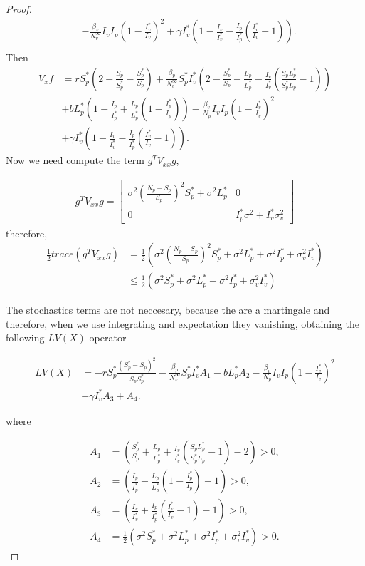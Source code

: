 \begin{proof}
\begin{align*}
				&-
					\frac{\beta_v}{N^\infty_v}I_vI_p\left(1-\frac{I_v^*}{I_v}\right)^2+\gamma I_v^*\left(1-\frac{I_v}{I_v^*}-\frac{I_p}{I_p^*}\left(\frac{I_v^*}{I_v}-1\right)\right).\\
	\end{align*}
Then
	\begin{align*}
		V_xf  	&=
					rS_p^*\left(2-\frac{S_p}{S_p^*}-\frac{S_p^*}{S_p}\right)+\frac{\beta_p}{N^\infty_v}S_p^*I_v^*\left(2-\frac{S_p^*}{S_p}-\frac{L_p}{L_p^*}-\frac{I_v}{I_v^*}\left(\frac{S_pL_p^*}{S_p^*L_p}-1\right)\right)\\
	  		  	&+
	  		  		bL_p^*\left(1-\frac{I_p}{I_p^*}+\frac{L_p}{L_p^*}\left(1-\frac{I_p^*}{I_p}\right)\right)-\frac{\beta_v}{N_p}I_vI_p\left(1-\frac{I_v^*}{I_v}\right)^2\\
	  		  	&+ 
	  		  		\gamma I_v^* \left(1-\frac{I_v}{I_v^*}-\frac{I_p}{I_p^*}\left(\frac{I_v^*}{I_v}-1\right)\right).		
	\end{align*}
	Now we need compute the term $g^TV_{xx}g$, 
	
	
	\begin{align*}
		g^TV_{xx}g=\begin{bmatrix}
		\sigma^2 \left(\frac{N_p-S_p}{S_p}\right)^2 S^*_p+\sigma^2 L^*_p &0\\
		0 & I^*_p \sigma^2+I^*_v \sigma_v^2
		\end{bmatrix}
	\end{align*}
	therefore,
		\begin{align*}
	\frac{1}{2}trace(g^TV_{xx}g) &=
		\frac{1}{2}\left(\sigma^2\left(\frac{N_p-S_p}{S_p}\right)^2S^*_p +\sigma^2L^*_p+\sigma^2I^*_p+\sigma_v^2I^*_v\right)\\
		&\leq
		\frac{1}{2}\left(\sigma^2S^*_p +\sigma^2L^*_p+\sigma^2I^*_p+\sigma_v^2I^*_v\right)
	\end{align*}
	
	The stochastics terms are not neccesary, because the are a martingale and therefore, when we use integrating and expectation they vanishing, obtaining the following $LV(X)$ operator
	
	\begin{align*}
		LV(X) &=
			-rS_p^*\frac{\left(S_p^*-S_p\right)^2}{S_pS_p^*}-\frac{\beta_p}{N^\infty_v}S_p^*I_v^*A_1-bL_p^*A_2-\frac{\beta_v}{N_p}I_vI_p\left(1-\frac{I_v^*}{I_v}\right)^2\\
			&- 
			\gamma I_v^* A_3+A_4.	
	\end{align*}
	
	where
	
	\begin{align*}
		A_1 &=
			\left(\frac{S_p^*}{S_p}+\frac{L_p}{L_p^*}+\frac{I_v}{I_v^*}\left(\frac{S_pL_p^*}{S_p^*L_p}-1\right)-2\right)>0,
		\\
		A_2 &=
			\left(\frac{I_p}{I_p^*}-\frac{L_p}{L_p^*}\left(1-\frac{I_p^*}{I_p}\right)-1\right)>0,
		\\
		A_3 &= 
			\left(\frac{I_v}{I_v^*}+\frac{I_p}{I_p^*}\left(\frac{I_v^*}{I_v}-1\right)-1\right)>0,
		\\
		A_4 &=
			\frac{1}{2}\left(\sigma^2S^*_p +\sigma^2L^*_p+\sigma^2I^*_p+\sigma_v^2I^*_v\right)>0.
	\end{align*}
	

\end{proof}
